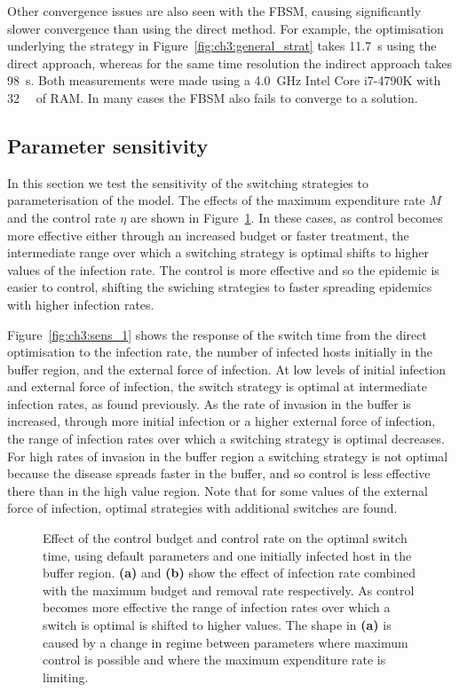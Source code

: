 Other convergence issues are also seen with the FBSM, causing significantly slower convergence than using the direct method. For example, the optimisation underlying the strategy in Figure~\ref{fig:ch3:general_strat} takes \SI{11.7}{\second} using the direct approach, whereas for the same time resolution the indirect approach takes \SI{98}{\second}. Both measurements were made using a \SI{4.0}{\giga\hertz} Intel Core i7-4790K with \SI{32}{\giga\byte} of RAM. In many cases the FBSM also fails to converge to a solution.

\subsection{Parameter sensitivity}

In this section we test the sensitivity of the switching strategies to parameterisation of the model. The effects of the maximum expenditure rate $M$ and the control rate $\eta$ are shown in Figure~\ref{fig:ch3:sens_2}. In these cases, as control becomes more effective either through an increased budget or faster treatment, the intermediate range over which a switching strategy is optimal shifts to higher values of the infection rate. The control is more effective and so the epidemic is easier to control, shifting the swiching strategies to faster spreading epidemics with higher infection rates.

Figure~\ref{fig:ch3:sens_1} shows the response of the switch time from the direct optimisation to the infection rate, the number of infected hosts initially in the buffer region, and the external force of infection. At low levels of initial infection and external force of infection, the switch strategy is optimal at intermediate infection rates, as found previously. As the rate of invasion in the buffer is increased, through more initial infection or a higher external force of infection, the range of infection rates over which a switching strategy is optimal decreases. For high rates of invasion in the buffer region a switching strategy is not optimal because the disease spreads faster in the buffer, and so control is less effective there than in the high value region. Note that for some values of the external force of infection, optimal strategies with additional switches are found.

\begin{figure}[H]
    \begin{center}
        \caption[Switch time sensitivity to control efficiency]{Effect of the control budget and control rate on the optimal switch time, using default parameters and one initially infected host in the buffer region. \textbf{(a)} and \textbf{(b)} show the effect of infection rate combined with the maximum budget and removal rate respectively. As control becomes more effective the range of infection rates over which a switch is optimal is shifted to higher values. The shape in \textbf{(a)} is caused by a change in regime between parameters where maximum control is possible and where the maximum expenditure rate is limiting.\label{fig:ch3:sens_2}}
    \end{center}
\end{figure}

